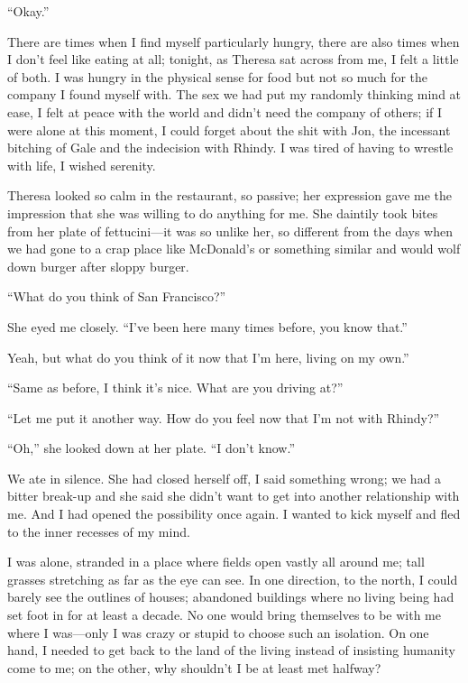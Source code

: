 ``Okay.''

There are times when I find myself particularly hungry, there are also
times when I don't feel like eating at all; tonight, as Theresa sat
across from me, I felt a little of both. I was hungry in the physical
sense for food but not so much for the company I found myself with. The
sex we had put my randomly thinking mind at ease, I felt at peace with
the world and didn't need the company of others; if I were alone at this
moment, I could forget about the shit with Jon, the incessant bitching
of Gale and the indecision with Rhindy. I was tired of having to wrestle
with life, I wished serenity.

Theresa looked so calm in the restaurant, so passive; her expression
gave me the impression that she was willing to do anything for me. She
daintily took bites from her plate of fettucini---it was so unlike her,
so different from the days when we had gone to a crap place like
McDonald's or something similar and would wolf down burger after sloppy
burger.

``What do you think of San Francisco?''

She eyed me closely. ``I've been here many times before, you know
that.''

Yeah, but what do you think of it now that I'm here, living on my own.''

``Same as before, I think it's nice. What are you driving at?''

``Let me put it another way. How do you feel now that I'm not with
Rhindy?''

``Oh,'' she looked down at her plate. ``I don't know.''

We ate in silence. She had closed herself off, I said something wrong;
we had a bitter break-up and she said she didn't want to get into
another relationship with me. And I had opened the possibility once
again. I wanted to kick myself and fled to the inner recesses of my
mind.

I was alone, stranded in a place where fields open vastly all around me;
tall grasses stretching as far as the eye can see. In one direction, to
the north, I could barely see the outlines of houses; abandoned
buildings where no living being had set foot in for at least a decade.
No one would bring themselves to be with me where I was---only I was
crazy or stupid to choose such an isolation. On one hand, I needed to
get back to the land of the living instead of insisting humanity come to
me; on the other, why shouldn't I be at least met halfway?


